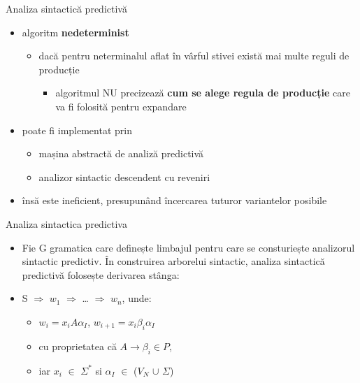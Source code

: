 \documentclass[pdf]{beamer}
\begin{document}
\begin{frame}{Analiza sintactică predictivă}
\begin{itemize}
\item
algoritm \textbf{nedeterminist}

\begin{itemize}
\item
dacă pentru neterminalul aflat în vârful stivei există mai multe reguli de producție
\begin{itemize}
\item
algoritmul NU precizează \textbf{cum se alege regula de producție} care va fi folosită pentru expandare
\end{itemize}
\end{itemize}

\item
poate fi implementat prin
\begin{itemize}
\item
mașina abstractă de analiză predictivă
\item
analizor sintactic descendent cu reveniri
\end{itemize}
\item
însă este ineficient, presupunând încercarea tuturor variantelor posibile
\end{itemize}
\end{frame}



\begin{frame}{Analiza sintactica predictiva}
\begin{itemize}
\item
Fie G gramatica care definește limbajul pentru care se consturiește analizorul sintactic predictiv. În construirea arborelui sintactic, analiza sintactică predictivă folosește derivarea stânga:

\end{itemize}
\begin{itemize}
\item
S $\Rightarrow$  $w_{1}$  $\Rightarrow$ … $\Rightarrow$ $w_{n}$, unde:

\begin{itemize}
\item
$w_{i} = x_{i}A\alpha_{I}$, $w_{i+1} = x_{i}\beta_{i} \alpha_{I}$
\item
cu proprietatea că $A \rightarrow \beta_{i} \in  P$,
\item
iar $x_{i}$ $\in$ $\Sigma^*$ si $\alpha_{I}$ $\in$ ($V_{N}$ $\cup$ $\Sigma$)
\end{itemize}
\end{itemize}
\end{frame}
\end{document}
